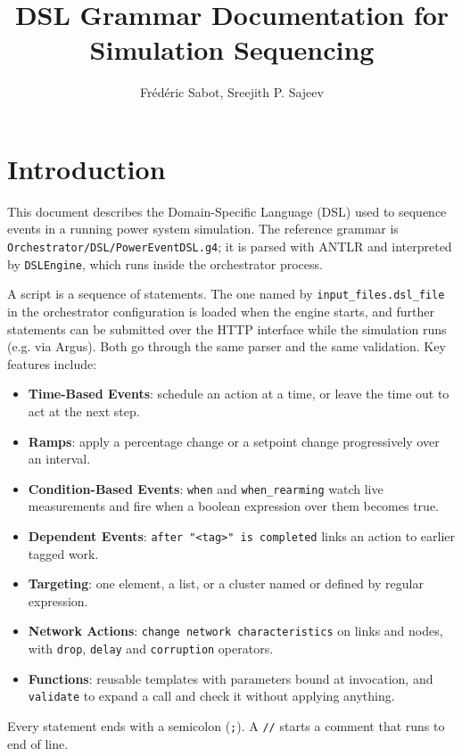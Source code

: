 \documentclass[12pt]{article}
\title{\textbf{DSL Grammar Documentation for Simulation Sequencing}}
\author{Frédéric Sabot, Sreejith P. Sajeev}
\date{\date{}}
\begin{document}
\maketitle

\section{Introduction}

This document describes the Domain-Specific Language (DSL) used to sequence events in a running power system simulation. The reference grammar is \texttt{Orchestrator/\allowbreak DSL/\allowbreak PowerEventDSL.g4}; it is parsed with ANTLR and interpreted by \texttt{DSLEngine}, which runs inside the orchestrator process.

A script is a sequence of statements. The one named by \texttt{input\_files.dsl\_file} in the orchestrator configuration is loaded when the engine starts, and further statements can be submitted over the HTTP interface while the simulation runs (e.g. via Argus). Both go through the same parser and the same validation. Key features include:

\begin{itemize}
  \item \textbf{Time-Based Events}: schedule an action at a time, or leave the time out to act at the next step.
  \item \textbf{Ramps}: apply a percentage change or a setpoint change progressively over an interval.
  \item \textbf{Condition-Based Events}: \texttt{when} and \texttt{when\_rearming} watch live measurements and fire when a boolean expression over them becomes true.
  \item \textbf{Dependent Events}: \texttt{after "<tag>" is completed} links an action to earlier tagged work.
  \item \textbf{Targeting}: one element, a list, or a cluster named or defined by regular expression.
  \item \textbf{Network Actions}: \texttt{change network characteristics} on links and nodes, with \texttt{drop}, \texttt{delay} and \texttt{corruption} operators.
  \item \textbf{Functions}: reusable templates with parameters bound at invocation, and \texttt{validate} to expand a call and check it without applying anything.
\end{itemize}

Every statement ends with a semicolon (\texttt{;}). A \texttt{//} starts a comment that runs to end of line.
\end{document}
